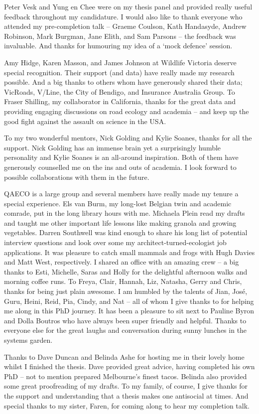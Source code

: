 \documentclass[titlesmallcaps,copyrightpage,examinerscopy]{uomthesis}
\begin{document}
Peter Vesk and Yung en Chee were on my thesis panel and provided really useful feedback throughout my candidature. I would also like to thank everyone who attended my pre-completion talk -- Graeme Coulson, Kath Handasyde, Andrew Robinson, Mark Burgman, Jane Elith, and Sam Parsons -- the feedback was invaluable. And thanks for humouring my idea of a `mock defence' session.

Amy Hidge, Karen Masson, and James Johnson at Wildlife Victoria deserve special recognition. Their support (and data) have really made my research possible. And a big thanks to others whom have generously shared their data; VicRoads, V/Line, the City of Bendigo, and Insurance Australia Group. To Fraser Shilling, my collaborator in California, thanks for the great data and providing engaging discussions on road ecology and academia -- and keep up the good fight against the assault on science in the USA.

To my two wonderful mentors, Nick Golding and Kylie Soanes, thanks for all the support. Nick Golding has an immense brain yet a surprisingly humble personality and Kylie Soanes is an all-around inspiration. Both of them have generously counselled me on the ins and outs of academia. I look forward to possible collaborations with them in the future.

QAECO is a large group and several members have really made my tenure a special experience. Els van Burm, my long-lost Belgian twin and academic comrade, put in the long library hours with me. Michaela Plein read my drafts and taught me other important life lessons like making granola and growing vegetables. Darren Southwell was kind enough to share his long list of potential interview questions and look over some my architect-turned-ecologist job applications. It was pleasure to catch small mammals and frogs with Hugh Davies and Matt West, respectively. I shared an office with an amazing crew -- a big thanks to Esti, Michelle, Saras and Holly for the delightful afternoon walks and morning coffee runs. To Freya, Clair, Hannah, Liz, Natasha, Gerry and Chris, thanks for being just plain awesome. I am humbled by the talents of Jian, Jos\'e, Guru, Heini, Reid, Pia, Cindy, and Nat -- all of whom I give thanks to for helping me along in this PhD journey. It has been a pleasure to sit next to Pauline Byron and Dolla Boutros who have always been super friendly and helpful. Thanks to everyone else for the great laughs and conversation during sunny lunches in the systems garden.

Thanks to Dave Duncan and Belinda Ashe for hosting me in their lovely home whilst I finished the thesis. Dave provided great advice, having completed his own PhD -- not to mention prepared Melbourne's finest tacos. Belinda also provided some great proofreading of my drafts. To my family, of course, I give thanks for the support and understanding that a thesis makes one antisocial at times. And special thanks to my sister, Faren, for coming along to hear my completion talk.
\end{document}
